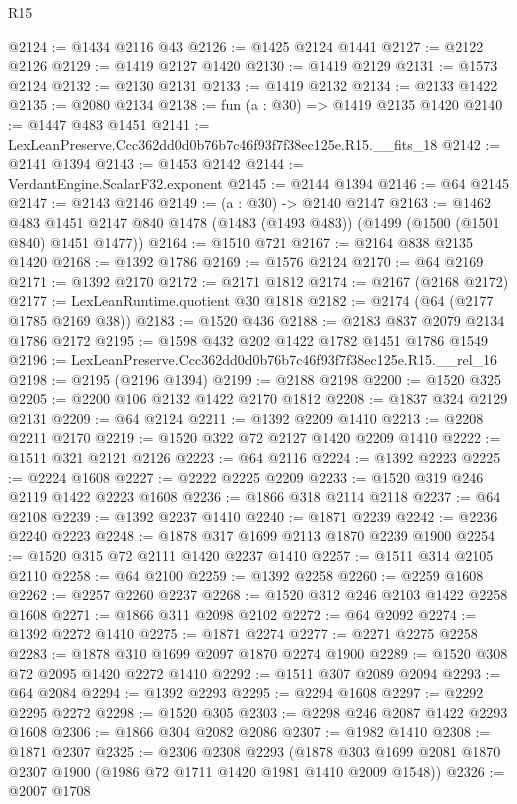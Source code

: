 \begin{lexlean}{R15}
\begin{coremodule}
@2124 := @1434 @2116 @43
@2126 := @1425 @2124 @1441
@2127 := @2122 @2126
@2129 := @1419 @2127 @1420
@2130 := @1419 @2129
@2131 := @1573 @2124
@2132 := @2130 @2131
@2133 := @1419 @2132
@2134 := @2133 @1422
@2135 := @2080 @2134
@2138 := fun (a : @30) => @1419 @2135 @1420
@2140 := @1447 @483 @1451
@2141 := LexLeanPreserve.Ccc362dd0d0b76b7c46f93f7f38ec125e.R15.__fits_18
@2142 := @2141 @1394
@2143 := @1453 @2142
@2144 := VerdantEngine.ScalarF32.exponent
@2145 := @2144 @1394
@2146 := @64 @2145
@2147 := @2143 @2146
@2149 := (a : @30) -> @2140 @2147
@2163 := @1462
    @483
    @1451
    @2147
    @840
    @1478
    (@1483 (@1493 @483))
    (@1499 (@1500 (@1501 @840) @1451 @1477))
@2164 := @1510 @721
@2167 := @2164 @838 @2135 @1420
@2168 := @1392 @1786
@2169 := @1576 @2124
@2170 := @64 @2169
@2171 := @1392 @2170
@2172 := @2171 @1812
@2174 := @2167 (@2168 @2172)
@2177 := LexLeanRuntime.quotient @30 @1818
@2182 := @2174 (@64 (@2177 @1785 @2169 @38))
@2183 := @1520 @436
@2188 := @2183 @837 @2079 @2134 @1786 @2172
@2195 := @1598 @432 @202 @1422 @1782 @1451 @1786 @1549
@2196 := LexLeanPreserve.Ccc362dd0d0b76b7c46f93f7f38ec125e.R15.__rel_16
@2198 := @2195 (@2196 @1394)
@2199 := @2188 @2198
@2200 := @1520 @325
@2205 := @2200 @106 @2132 @1422 @2170 @1812
@2208 := @1837 @324 @2129 @2131
@2209 := @64 @2124
@2211 := @1392 @2209 @1410
@2213 := @2208 @2211 @2170
@2219 := @1520 @322 @72 @2127 @1420 @2209 @1410
@2222 := @1511 @321 @2121 @2126
@2223 := @64 @2116
@2224 := @1392 @2223
@2225 := @2224 @1608
@2227 := @2222 @2225 @2209
@2233 := @1520 @319 @246 @2119 @1422 @2223 @1608
@2236 := @1866 @318 @2114 @2118
@2237 := @64 @2108
@2239 := @1392 @2237 @1410
@2240 := @1871 @2239
@2242 := @2236 @2240 @2223
@2248 := @1878 @317 @1699 @2113 @1870 @2239 @1900
@2254 := @1520 @315 @72 @2111 @1420 @2237 @1410
@2257 := @1511 @314 @2105 @2110
@2258 := @64 @2100
@2259 := @1392 @2258
@2260 := @2259 @1608
@2262 := @2257 @2260 @2237
@2268 := @1520 @312 @246 @2103 @1422 @2258 @1608
@2271 := @1866 @311 @2098 @2102
@2272 := @64 @2092
@2274 := @1392 @2272 @1410
@2275 := @1871 @2274
@2277 := @2271 @2275 @2258
@2283 := @1878 @310 @1699 @2097 @1870 @2274 @1900
@2289 := @1520 @308 @72 @2095 @1420 @2272 @1410
@2292 := @1511 @307 @2089 @2094
@2293 := @64 @2084
@2294 := @1392 @2293
@2295 := @2294 @1608
@2297 := @2292 @2295 @2272
@2298 := @1520 @305
@2303 := @2298 @246 @2087 @1422 @2293 @1608
@2306 := @1866 @304 @2082 @2086
@2307 := @1982 @1410
@2308 := @1871 @2307
@2325 := @2306
    @2308
    @2293
    (@1878 @303 @1699 @2081 @1870 @2307 @1900 (@1986 @72 @1711 @1420 @1981 @1410 @2009 @1548))
@2326 := @2007 @1708

\end{coremodule}
\end{lexlean}
